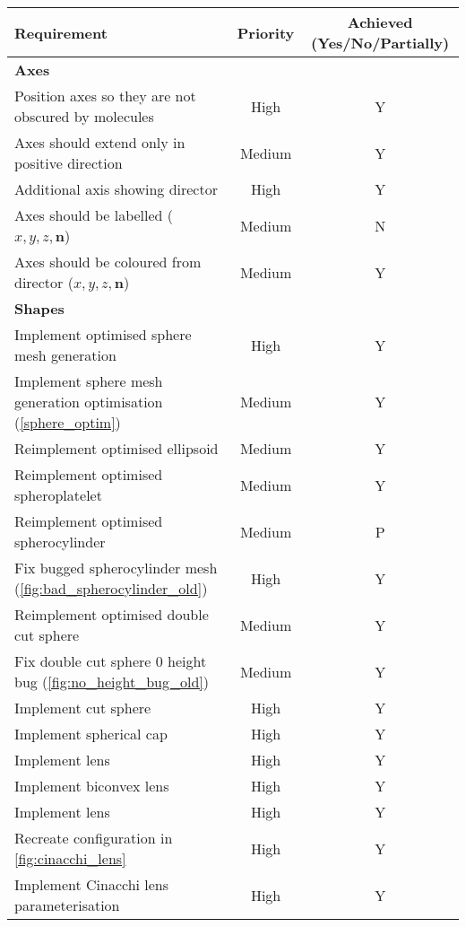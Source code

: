 \begin{table}
  \begin{center}
  \begin{adjustbox}{width=\textwidth}
    \begin{tabular}{lcc}
    \hline\hline
       \textbf{Requirement} & \textbf{Priority} & \textbf{Achieved (Yes/No/Partially)} \\
       \hline
       \textbf{Axes} & &\\
       \hline
       Position axes so they are not obscured by molecules & High & Y\\
       Axes should extend only in positive direction & Medium & Y\\
       Additional axis showing director & High & Y\\
       Axes should be labelled ($x,y,z,\mathbf{n}$)& Medium & N\\
       Axes should be coloured from director ($x,y,z,\mathbf{n}$)& Medium & Y\\
        \hline
       \textbf{Shapes} & &\\
       \hline
       Implement optimised sphere mesh generation & High & Y\\
       Implement sphere mesh generation optimisation (\cref{sphere_optim}) & Medium & Y\\
       Reimplement optimised ellipsoid & Medium & Y\\
       Reimplement optimised spheroplatelet & Medium & Y\\
       Reimplement optimised spherocylinder & Medium & P\\
       Fix bugged spherocylinder mesh (\cref{fig:bad_spherocylinder_old}) & High & Y\\
       Reimplement optimised double cut sphere & Medium & Y\\
       Fix double cut sphere 0 height bug (\cref{fig:no_height_bug_old}) & Medium & Y\\
       Implement cut sphere & High & Y\\
       Implement spherical cap & High & Y\\
       Implement lens & High & Y\\
       Implement biconvex lens & High & Y\\
       Implement lens & High & Y\\
       Recreate configuration in \cref{fig:cinacchi_lens} & High & Y\\
       Implement Cinacchi lens parameterisation & High & Y\\

\end{tabular}
\end{adjustbox}
\end{center}
\end{table}
